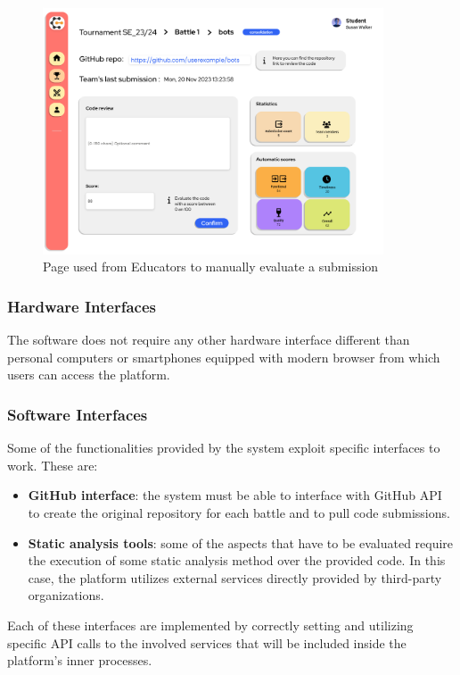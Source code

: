 \begin{enumerate}[label=\textbf{F\arabic*)}]
\begin{figure}[H]
        \includegraphics[width=0.9\textwidth]{Mockups/17_educator_manual.png}
        \caption{Page used from Educators to manually evaluate a submission}
    \end{figure}
\end{enumerate}

\subsubsection{Hardware Interfaces}
The software does not require any other hardware interface different than personal computers or smartphones equipped with modern browser from which users can access the platform.
\subsubsection{Software Interfaces}
Some of the functionalities provided by the system exploit specific interfaces to work. These are:
\begin{itemize}
    \item \textbf{GitHub interface}: the system must be able to interface with GitHub API to create the original repository for each battle and to pull code submissions.
    \item \textbf{Static analysis tools}: some of the aspects that have to be evaluated require the execution of some static analysis method over the provided code. In this case, the platform utilizes external services directly provided by third-party organizations.
\end{itemize}
Each of these interfaces are implemented by correctly setting and utilizing specific API calls to the involved services that will be included inside the platform’s inner processes.

